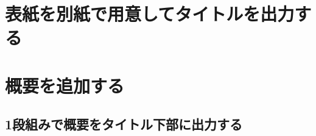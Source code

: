 \section{表紙を別紙で用意してタイトルを出力する}



\section{概要を追加する}
%
\begin{usage}
\begin{abstract}
 $\<概要をここに記述します>$
\end{abstract} %
\end{usage}

%
%



\subsection{1段組みで概要をタイトル下部に出力する}


